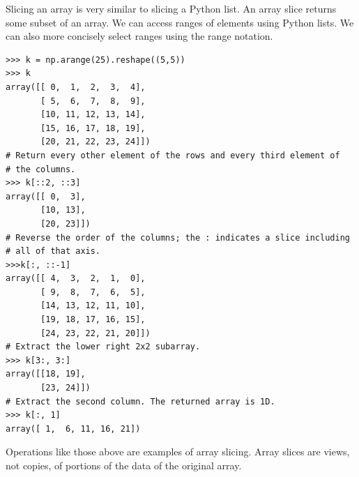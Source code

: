 Slicing an array is very similar to slicing a Python list. An array
slice returns some subset of an array. We can access ranges of elements
using Python lists. We can also more concisely select ranges using the
 range notation. 
\begin{lstlisting}
>>> k = np.arange(25).reshape((5,5)) 
>>> k
array([[ 0,  1,  2,  3,  4],
       [ 5,  6,  7,  8,  9],
       [10, 11, 12, 13, 14],
       [15, 16, 17, 18, 19],
       [20, 21, 22, 23, 24]])
# Return every other element of the rows and every third element of
# the columns.  
>>> k[::2, ::3] 
array([[ 0,  3],
       [10, 13],
       [20, 23]])
# Reverse the order of the columns; the : indicates a slice including
# all of that axis.
>>>k[:, ::-1] 
array([[ 4,  3,  2,  1,  0],
       [ 9,  8,  7,  6,  5],
       [14, 13, 12, 11, 10],
       [19, 18, 17, 16, 15],
       [24, 23, 22, 21, 20]])
# Extract the lower right 2x2 subarray.
>>> k[3:, 3:] 
array([[18, 19],
       [23, 24]])
# Extract the second column. The returned array is 1D.
>>> k[:, 1] 
array([ 1,  6, 11, 16, 21]) 
\end{lstlisting} 

Operations like those above
are examples of array slicing. Array slices are views, not copies, of
portions of the data of the original array.

% 
